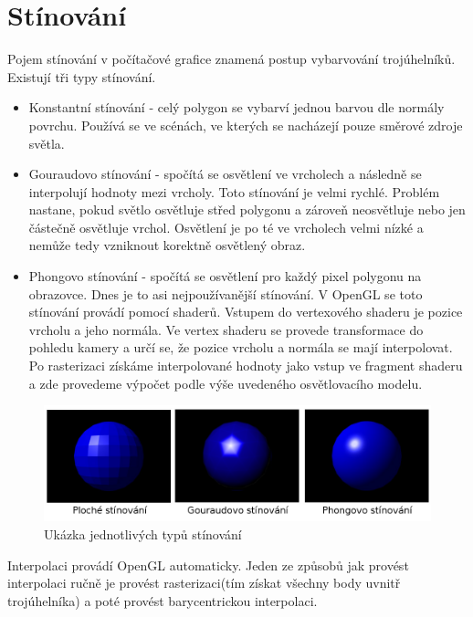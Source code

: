 \documentclass[11pt,twoside,a4paper]{book}
\begin{document}
\section{Stínování}
Pojem stínování v počítačové grafice znamená postup vybarvování trojúhelníků. Existují tři typy stínování.
\begin{itemize}
\item Konstantní stínování - celý polygon se vybarví jednou barvou dle normály povrchu. Používá se ve scénách, ve kterých se nacházejí pouze směrové zdroje světla.
\item Gouraudovo stínování - spočítá se osvětlení ve vrcholech a následně se interpolují hodnoty mezi vrcholy. Toto stínování je velmi rychlé. Problém nastane, pokud světlo osvětluje střed polygonu a zároveň neosvětluje nebo jen částečně osvětluje vrchol. Osvětlení je po té ve vrcholech velmi nízké a nemůže tedy vzniknout korektně osvětlený obraz.
\item Phongovo stínování - spočítá se osvětlení pro každý pixel polygonu na obrazovce. Dnes je to asi nejpoužívanější stínování. V OpenGL se toto stínování provádí pomocí shaderů. Vstupem do vertexového shaderu je pozice vrcholu a jeho normála. Ve vertex shaderu se provede transformace do pohledu kamery a určí se, že pozice vrcholu a normála se mají interpolovat. Po rasterizaci získáme interpolované hodnoty jako vstup ve fragment shaderu a zde provedeme výpočet podle výše uvedeného osvětlovacího modelu.
\end{itemize}

\begin{center}
\begin{figure}[h]
\includegraphics[width=135mm]{figures/shading.png}
\caption{Ukázka jednotlivých typů stínování}
\end{figure}
\end{center}
\newpage

Interpolaci provádí OpenGL automaticky. Jeden ze způsobů jak provést interpolaci ručně je provést rasterizaci(tím získat všechny body uvnitř trojúhelníka) a poté provést barycentrickou interpolaci.
\end{document}
